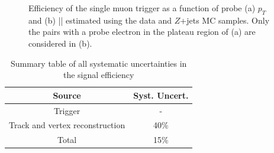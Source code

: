 \begin{figure}[!htb]
    \centering
    \caption{Efficiency of the single muon trigger as a function of probe (a) $p_{T}$ and (b) |\zzero| estimated using the data and $Z$+jets MC samples. Only the pairs with a probe electron in the plateau region of (a) are considered in (b).}
    \label{fig:MuonTrigEff1D}
\end{figure}





\begin{table}[!htb]
	\centering
	\begin{tabular}{cc}
		\hline
		\hline
		Source                              &       Syst. Uncert.       \\
		\hline
        Trigger                             &       -                   \\
        Track and vertex reconstruction     &       40\%                \\
		\hline
        Total                               &       15\%                \\
		\hline
		\hline
	\end{tabular}
	\caption{Summary table of all systematic uncertainties in the signal efficiency}
	\label{tab:syst_total}
\end{table}



























